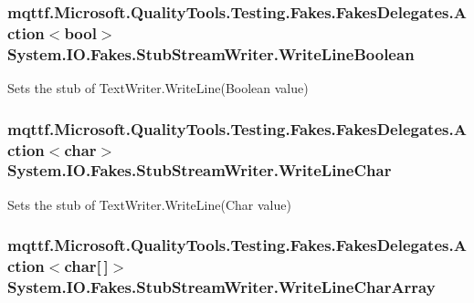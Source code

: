 \hypertarget{class_system_1_1_i_o_1_1_fakes_1_1_stub_stream_writer_a9ceba865359a6c304cd17d9eebd85bf4}{
\subsubsection[{Write\-Line\-Boolean}]{\setlength{\rightskip}{0pt plus 5cm}mqttf.\-Microsoft.\-Quality\-Tools.\-Testing.\-Fakes.\-Fakes\-Delegates.\-Action$<$bool$>$ System.\-I\-O.\-Fakes.\-Stub\-Stream\-Writer.\-Write\-Line\-Boolean}}\label{class_system_1_1_i_o_1_1_fakes_1_1_stub_stream_writer_a9ceba865359a6c304cd17d9eebd85bf4}


Sets the stub of Text\-Writer.\-Write\-Line(\-Boolean value)

\hypertarget{class_system_1_1_i_o_1_1_fakes_1_1_stub_stream_writer_adc925977622115bf20eb6793c75a3f9a}{
\subsubsection[{Write\-Line\-Char}]{\setlength{\rightskip}{0pt plus 5cm}mqttf.\-Microsoft.\-Quality\-Tools.\-Testing.\-Fakes.\-Fakes\-Delegates.\-Action$<$char$>$ System.\-I\-O.\-Fakes.\-Stub\-Stream\-Writer.\-Write\-Line\-Char}}\label{class_system_1_1_i_o_1_1_fakes_1_1_stub_stream_writer_adc925977622115bf20eb6793c75a3f9a}


Sets the stub of Text\-Writer.\-Write\-Line(\-Char value)

\hypertarget{class_system_1_1_i_o_1_1_fakes_1_1_stub_stream_writer_a790c703e9b051c3c7eb0940e31e1f22b}{
\subsubsection[{Write\-Line\-Char\-Array}]{\setlength{\rightskip}{0pt plus 5cm}mqttf.\-Microsoft.\-Quality\-Tools.\-Testing.\-Fakes.\-Fakes\-Delegates.\-Action$<$char\mbox{[}$\,$\mbox{]}$>$ System.\-I\-O.\-Fakes.\-Stub\-Stream\-Writer.\-Write\-Line\-Char\-Array}}\label{class_system_1_1_i_o_1_1_fakes_1_1_stub_stream_writer_a790c703e9b051c3c7eb0940e31e1f22b}


